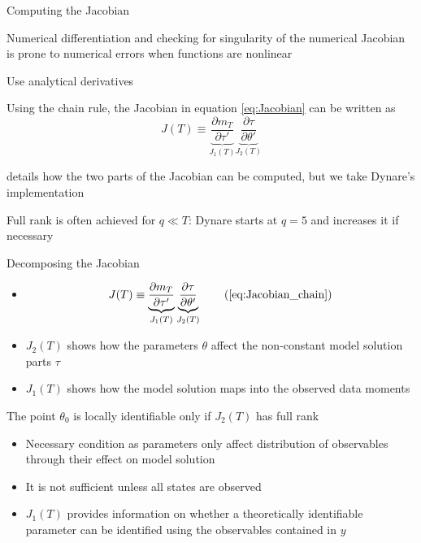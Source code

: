 \documentclass[handout,usepdftitle=false,xcolor=dvipsnames,aspectratio=169]{beamer}
\begin{document}
\begin{frame}{Computing the Jacobian}
  \begin{witemize}
    \item Numerical differentiation and checking for singularity of the numerical Jacobian is prone to numerical errors when functions are nonlinear
    \item[$\Rightarrow$] Use analytical derivatives
    \item Using the chain rule, the Jacobian in equation \eqref{eq:Jacobian} can be written as
    \begin{equation}
      J(T) \equiv \underbrace {\frac{{\partial {m_T}}}{{\partial \tau '}}}_{{J_1}\left( T \right)}\underbrace {\frac{{\partial \tau }}{{\partial \theta '}}}_{{J_2}\left( T \right)} \label{eq:Jacobian_chain}
    \end{equation}
    \item \textcite{Iskrev2010} details how the two parts of the Jacobian can be computed, but we take Dynare's implementation
    \item Full rank is often achieved for $q\ll T$: Dynare starts at $q=5$ and increases it if necessary
  \end{witemize}
\end{frame}

\begin{frame}{Decomposing the Jacobian}
  \begin{itemize}
    \item[]
          \begin{equation}
            J(T) \equiv \underbrace {\frac{{\partial {m_T}}}{{\partial \tau '}}}_{{J_1}\left( T \right)}\underbrace {\frac{{\partial \tau }}{{\partial \theta '}}}_{{J_2}\left( T \right)} \tag{\ref{eq:Jacobian_chain}}
          \end{equation}
    \item ${J_2}\left( T \right)$ shows how the parameters $\theta$ affect the non-constant model solution parts $\tau$
    \item ${J_1}\left( T \right)$ shows how the model solution maps into the observed data moments
  \end{itemize}
  \begin{corollary}
    The point $\theta_0$ is locally identifiable only if $J_2(T)$ has full rank
  \end{corollary}
  \begin{itemize}
    \item Necessary condition as parameters only affect distribution of observables through their effect on model solution
    \item It is not sufficient unless all states are observed
    \item ${{J_1}\left( T \right)}$ provides information on whether a theoretically identifiable parameter can be identified using the observables contained in $y$
  \end{itemize}
\end{frame}
\end{document}
